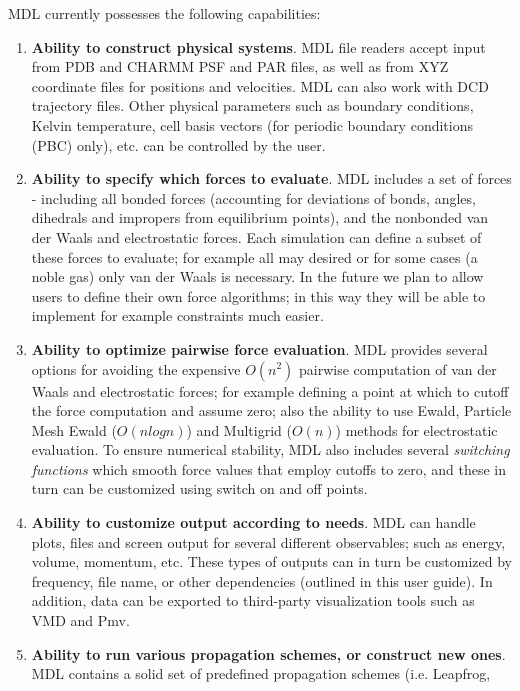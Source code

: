\documentclass[11pt]{report}
\begin{document}
MDL currently possesses the following capabilities:
\begin{enumerate}
\item {\bf Ability to construct physical systems}.  MDL file readers
accept input from PDB and CHARMM PSF and PAR files, as well as from XYZ
coordinate files for positions and velocities.  MDL can also work
with DCD trajectory files.  Other physical parameters such as boundary
conditions, Kelvin temperature, cell basis vectors (for periodic boundary
conditions (PBC) only), etc. can be controlled by the user.
\item {\bf Ability to specify which forces to evaluate}.  MDL includes 
a set of forces - including all bonded forces (accounting for deviations
of bonds, angles, dihedrals and impropers from equilibrium points), and
the nonbonded van der Waals and electrostatic forces.  Each simulation
can define a subset of these forces to evaluate; for example all may desired 
or for some cases (a noble gas) only van der Waals is necessary.
In the future we plan to allow users to define their own force
algorithms; in this way they will be able to implement for example
constraints much easier.
\item {\bf Ability to optimize pairwise force evaluation}.  MDL provides
several options for avoiding the expensive \begin{math}O(n^{2})\end{math}
pairwise computation of van der Waals and electrostatic forces; for example
defining a point at which to cutoff the force computation and assume zero;
also the ability to use Ewald, Particle Mesh Ewald (\begin{math}O(n log n)\end{math}) and Multigrid (\begin{math}O(n)\end{math}) methods for electrostatic
evaluation.  To ensure numerical stability, MDL also includes several
{\it switching functions} which smooth force values that employ cutoffs
to zero, and these in turn can be customized using switch on and off points.
\item {\bf Ability to customize output according to needs}.  MDL can handle
plots, files and screen output for several different observables; such
as energy, volume, momentum, etc.  These types of outputs can in turn be 
customized by frequency, file name, or other dependencies (outlined in this 
user guide).  In addition, data can be exported to third-party visualization
tools such as VMD and Pmv.
\item {\bf Ability to run various propagation schemes, or construct new ones}.  MDL contains a solid set of predefined propagation schemes (i.e. Leapfrog,

\end{enumerate}
\end{document}
